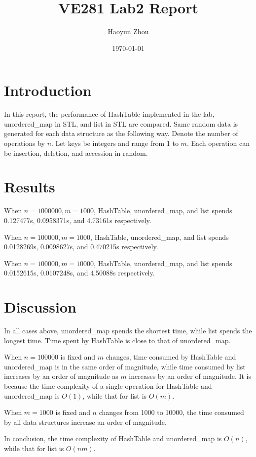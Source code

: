 \documentclass{article}
\title{VE281 Lab2 Report}
\author{Haoyun Zhou}
\date{\today}
\begin{document}
\maketitle

\section{Introduction}
In this report, the performance of HashTable implemented in the lab, unordered\_map in STL, and list in STL are compared. Same random data is generated for each data structure as the following way. Denote the number of operations by $n$. Let keys be integers and range from 1 to $m$. Each operation can be insertion, deletion, and accession in random.

\section{Results}
When $n=1000000, m=1000$, HashTable, unordered\_map, and list spends 0.127477s, 0.0958371s, and 4.73161s respectively. \par
When $n=100000, m=1000$, HashTable, unordered\_map, and list spends 0.0128269s, 0.0098627s, and 0.470215s respectively. \par
When $n=100000, m=10000$, HashTable, unordered\_map, and list spends 0.0152615s, 0.0107248s, and 4.50088s respectively.

\section{Discussion}
In all cases above, unordered\_map spends the shortest time, while list spends the longest time. Time spent by HashTable is close to that of unordered\_map. \par
When $n=100000$ is fixed and $m$ changes, time consumed by HashTable and unordered\_map is in the same order of magnitude, while time consumed by list increases by an order of magnitude as $m$ increases by an order of magnitude. It is because the time complexity of a single operation for HashTable and unordered\_map is $O(1)$, while that for list is $O(m)$. \par
When $m=1000$ is fixed and $n$ changes from 1000 to 10000, the time consumed by all data structures increase an order of magnitude. \par
In conclusion, the time complexity of HashTable and unordered\_map is $O(n)$, while that for list is $O(nm)$.
\end{document}
